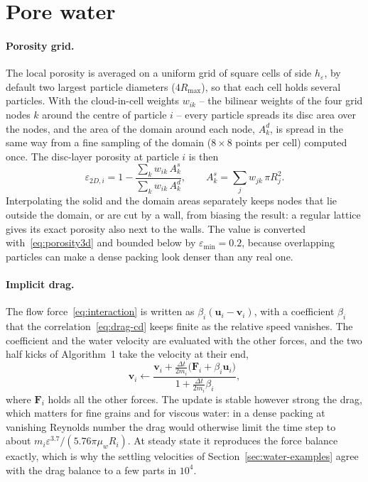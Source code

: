\section{Pore water}
\label{sec:water-numerics}

\paragraph{Porosity grid.}  The local porosity is averaged on a uniform grid of
square cells of side $h_{\varepsilon}$, by default two largest particle
diameters ($4R_{\max}$), so that each cell holds several particles.  With the
cloud-in-cell weights $w_{ik}$ -- the bilinear weights of the four grid nodes $k$
around the centre of particle $i$ -- every particle spreads its disc area over
the nodes, and the area of the domain around each node, $A^{d}_{k}$, is spread
in the same way from a fine sampling of the domain ($8\times8$ points per cell)
computed once.  The disc-layer porosity at particle $i$ is then
\begin{equation}
  \varepsilon_{2D,i} = 1 - \frac{\sum_{k} w_{ik}\,A^{s}_{k}}{\sum_{k} w_{ik}\,A^{d}_{k}},
  \qquad A^{s}_{k} = \sum_{j} w_{jk}\,\pi R_{j}^{2}.
  \label{eq:cic}
\end{equation}
Interpolating the solid and the domain areas separately keeps nodes that lie
outside the domain, or are cut by a wall, from biasing the result: a regular
lattice gives its exact porosity also next to the walls.  The value is converted
with~\eqref{eq:porosity3d} and bounded below by $\varepsilon_{\min}=0.2$, because
overlapping particles can make a dense packing look denser than any real one.

\paragraph{Implicit drag.}  The flow force~\eqref{eq:interaction} is written as
$\beta_{i}(\mathbf{u}_{i}-\mathbf{v}_{i})$, with a coefficient $\beta_{i}$ that the
correlation~\eqref{eq:drag-cd} keeps finite as the relative speed vanishes.  The
coefficient and the water velocity are evaluated with the other forces, and the
two half kicks of Algorithm~1 take the velocity at their end,
\begin{equation}
  \mathbf{v}_{i} \leftarrow
  \frac{\mathbf{v}_{i} + \tfrac{\Delta t}{2m_{i}}\bigl(\mathbf{F}_{i}+\beta_{i}\mathbf{u}_{i}\bigr)}
       {1+\tfrac{\Delta t}{2m_{i}}\beta_{i}},
  \label{eq:implicit-drag}
\end{equation}
where $\mathbf{F}_{i}$ holds all the other forces.  The update is stable however
strong the drag, which matters for fine grains and for viscous water: in a dense
packing at vanishing Reynolds number the drag would otherwise limit the time
step to about $m_{i}\varepsilon^{3.7}/(5.76\pi\mu_{w}R_{i})$.  At steady state it
reproduces the force balance exactly, which is why the settling velocities of
Section~\ref{sec:water-examples} agree with the drag balance to a few parts in
$10^{4}$.

